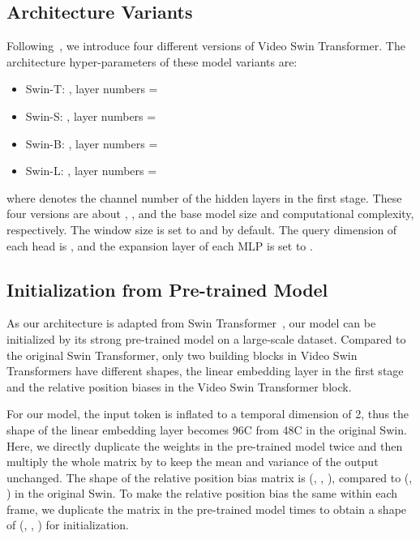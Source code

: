 \documentclass{article}
\begin{document}
\subsection{Architecture Variants}

Following~\cite{liu2021swin}, we introduce four different versions of Video Swin Transformer.
The architecture hyper-parameters of these model variants are:
\begin{itemize}
    \item Swin-T: , layer numbers = 
    \item Swin-S: , layer numbers =
    \item Swin-B: , layer numbers =
    \item Swin-L: , layer numbers = 
\end{itemize}
where  denotes the channel number of the hidden layers in the first stage. 
These four versions are about , ,  and  the base model size and computational complexity, respectively. The window size is set to  and  by default. The query dimension of each head is , and the expansion layer of each MLP is set to . 


\subsection{Initialization from Pre-trained Model}

As our architecture is adapted from Swin Transformer~\cite{liu2021swin}, our model can be initialized by its strong pre-trained model on a large-scale dataset.
Compared to the original Swin Transformer, only two building blocks in Video Swin Transformers have different shapes, the linear embedding layer in the first stage and the relative position biases in the Video Swin Transformer block.

For our model, the input token is inflated to a temporal dimension of 2, thus the shape of the linear embedding layer becomes 96C from 48C in the original Swin. Here, we directly duplicate the weights in the pre-trained model twice and then multiply the whole matrix by  to keep the mean and variance of the output unchanged.
The shape of the relative position bias matrix is (, , ), compared to (, ) in the original Swin. To make the relative position bias the same within each frame, we duplicate the matrix in the pre-trained model  times to obtain a shape of (, , ) for initialization. 
\end{document}
